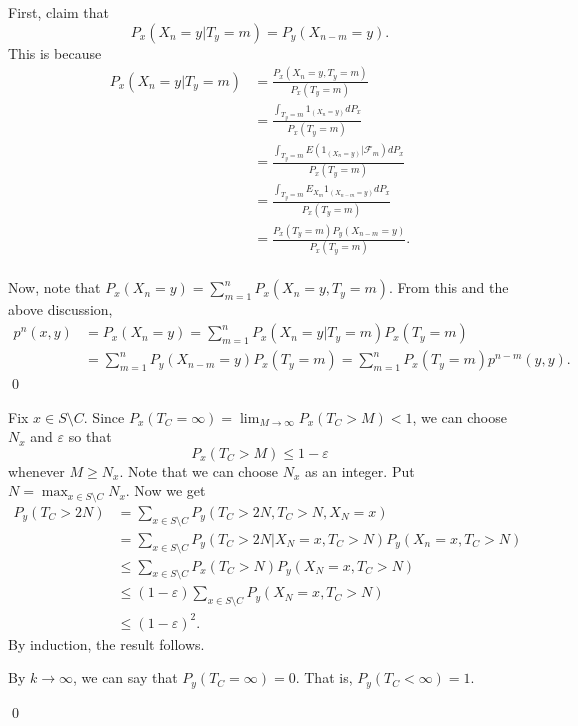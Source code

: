 \begin{problem}[5.2.4]\hfill
	
	First, claim that
	\[
		P_x\left( X_n =y \lvert T_y = m \right) = P_y\left( X_{n-m} = y \right).
	\]
	This is because
	\[
		\begin{split}
			P_x\left( X_n = y \lvert T_y = m \right) & = \frac{P_x\left( X_n = y, T_y = m \right)}{P_x\left( T_y = m \right)} \\
			& = \frac{\int_{T_y = m} 1_{(X_n = y)}dP_x}{P_x\left( T_y = m \right)} \\
			& = \frac{\int_{T_y = m} E\left( 1_{(X_n = y)} \lvert \mathcal{F}_m \right)dP_x}{P_x\left ( T_y = m \right )} \\
			& = \frac{\int_{T_y = m} E_{X_m}1_{(X_{n-m} = y)}dP_x}{P_x\left( T_y = m \right)} \\
			& = \frac{P_x\left( T_y = m \right) P_y\left( X_{n-m} = y \right)}{P_x\left( T_y = m \right)}.\\
		\end{split}
	\]

	Now, note that $P_x\left( X_n = y \right) = \sum_{m=1}^n P_x \left( X_n = y, T_y = m \right)$.
	From this and the above discussion,
	\[
		\begin{split}
			p^n(x, y) & = P_x\left( X_n = y \right) = \sum_{m=1}^n P_x\left( X_n = y \lvert T_y = m \right)P_x\left( T_y = m \right) \\
		& = \sum_{m=1}^n P_y\left( X_{n-m} = y \right )P_x\left( T_y = m \right) = \sum_{m=1}^n P_x\left( T_y = m \right)p^{n-m}(y, y).
		\end{split}
	\]
	\qed
\end{problem}


\begin{problem}[5.2.6]\hfill

	Fix $x \in S \setminus C$.
	Since $P_x(T_C = \infty) = \lim_{M\rightarrow \infty} P_x(T_C > M) < 1$, we can choose $N_x$ and $\varepsilon$ so that
	\[
		P_x(T_C > M) \leq 1-\varepsilon
	\]
	whenever $M \geq N_x$. Note that we can choose $N_x$ as an integer.
	Put $N = \max_{x \in S\setminus C} N_x$.
	Now we get
	\[
		\begin{split}
			P_y(T_C > 2N) & = \sum_{x\in S\setminus C} P_y(T_C > 2N, T_C>N, X_N = x) \\
			& = \sum_{x\in S\setminus C} P_y\left( T_C > 2N \lvert X_N = x, T_C > N \right)P_y(X_n = x, T_C > N) \\
			& \leq \sum_{x\in S\setminus C} P_x(T_C > N) P_y(X_N = x, T_C >N) \\
			& \leq (1-\varepsilon)\sum_{x \in S\setminus C}P_y(X_N = x, T_C > N) \\
			& \leq (1-\varepsilon)^2.
		\end{split}
	\]
	By induction, the result follows.

	\begin{remark}
		By $k\rightarrow \infty$, we can say that $P_y\left( T_C = \infty \right) = 0$.
		That is, $P_y\left( T_C < \infty \right) = 1$.
		\label{remark526}
	\end{remark}
	\qed
\end{problem}

